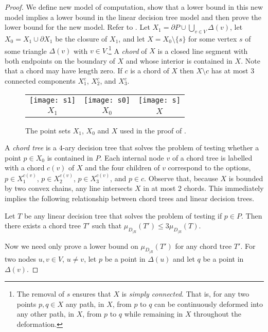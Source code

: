 \documentclass[charterfonts,lotsofwhite]{patmorin}
\newcommand{\boundary}{\partial}
\begin{document}
\begin{proof}

We define new model of computation, show that a lower bound in this
new model implies a lower bound in the linear decision tree model and
then prove the lower bound for the new model.  Refer to .
Let $X_1= \boundary P \cup \bigcup_{v\in V} \Delta(v)$, let
$X_0=X_1\cup\boundary X_1$ be the closure of $X_1$, and let
$X=X_0\setminus\{s\}$ for some vertex $s$ of some triangle $\Delta(v)$
with $v\in V$.\footnote{The removal of $s$ ensures that $X$ is
\emph{simply connected}.  That is, for any two points $p,q\in X$ any
path, in $X$, from $p$ to $q$ can be continuously deformed into any
other path, in $X$, from $p$ to $q$ while remaining in $X$ throughout
the deformation.} A \emph{chord} of $X$ is a closed line segment with
both endpoints on the boundary of $X$ and whose interior is contained
in $X$. Note that a chord may have length zero.  If $c$ is a chord of
$X$ then $X\setminus c$ has at most 3 connected components $X^c_1$,
$X^c_2$, and $X^c_3$.

\begin{figure}
\begin{center}
\begin{tabular}{ccc}
\texttt{[image: s1]} &
\texttt{[image: s0]} &
\texttt{[image: s]} \\
$X_1$ & $X_0$ & $X$ 
\end{tabular}
\end{center}
\caption{The point sets $X_1$, $X_0$ and $X$ used in the proof of
.}
\end{figure}

A \emph{chord tree} is a $4$-ary decision tree that solves the problem
of testing whether a point $p\in X_0$ is contained in $P$.  Each
internal node $v$ of a chord tree is labelled with a chord $c(v)$ of
$X$ and the four children of $v$ correspond to the options,
$p\in X^{c(v)}_1$, $p\in X^{c(v)}_2$, $p\in X^{c(v)}_3$, and $p\in c$.
Observe that, because $X$ is bounded by two convex chains, any line
intersects $X$ in at most 2 chords.  This immediately implies the
following relationship between chord trees and linear decision trees.
\begin{clm}
Let $T$ be any linear decision tree that solves the problem of testing
if $p\in P$.  Then there exists a chord tree $T'$ such that 
$\mu_{D_{|R}}(T') \le 3\mu_{D_{|R}}(T)$.
\end{clm}

Now we need only prove a lower bound on $\mu_{D_{|R}}(T')$ for any
chord tree $T'$.  For two nodes $u,v\in V$, $u\neq v$, let $p$ be a
point in $\Delta(u)$ and let $q$ be a point in $\Delta(v)$.  


\end{proof}
\end{document}
